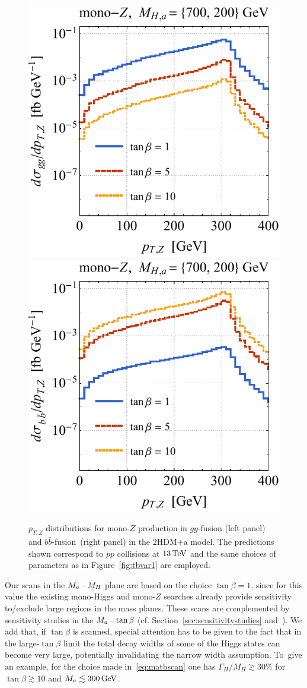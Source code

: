 \documentclass[a4paper, 11pt,notoc]{article}
\newcommand{\ma}{\ensuremath{M_{a}}\xspace}
\newcommand{\hdma}{\ensuremath{\textrm{2HDM+a}}\xspace}
\begin{document}
 \begin{figure}[t!]
\centering
\includegraphics[height=0.45\textwidth]{tblz.pdf} \qquad 
\includegraphics[height=0.45\textwidth]{tbrz.pdf}
\vspace{2mm}
\vspace{2mm}
\caption{\label{fig:tbvar2} 
$p_{T,Z}$ distributions for mono-$Z$ production in $gg$-fusion (left panel) and $b \bar b$-fusion~(right panel) in the \hdma model. The  predictions shown correspond to $pp$ collisions at $13 \, {\rm TeV}$ and the same choices of parameters as in Figure~\ref{fig:tbvar1} are employed.}
\end{figure}

Our  scans in the $M_{a}\hspace{0.5mm}$--$\hspace{0.5mm} M_H$ plane are based on the choice $\tan \beta = 1$, since for this value the existing mono-Higgs and mono-$Z$ searches already provide sensitivity to/exclude large regions in the mass planes.  These  scans are complemented by sensitivity studies in the $\ma \hspace{0.5mm}$--$\hspace{0.5mm} \tan \beta$ (cf. Section~\ref{sec:sensitivitystudies} and~\cite{No:2015xqa,Bauer:2017ota,Pani:2017qyd}).  We add that, if $\tan \beta$ is scanned, special attention has to be given to the fact that in the large-$\tan \beta$ limit the total decay widths of some of the Higgs states can become very large, potentially invalidating the narrow width assumption.   To~give an example, for the choice made in~\eqref{eq:matbscan} one has $\Gamma_{H}/M_H \gtrsim 30\%$ for $\tan \beta \gtrsim 10$ and $M_a \lesssim 300 \, {\rm GeV}$. 
\end{document}
